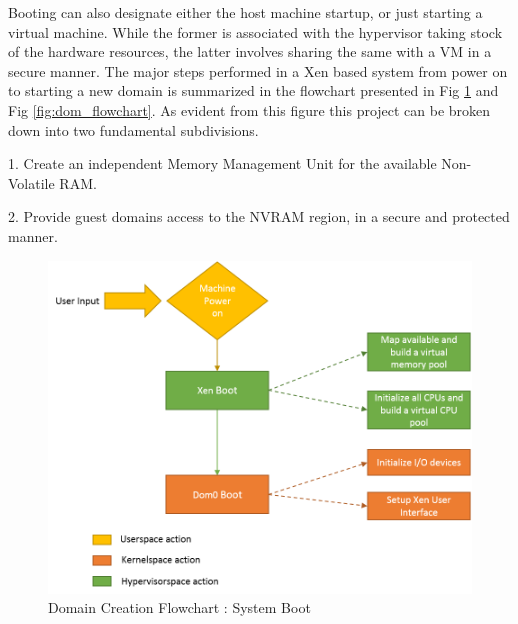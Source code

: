 Booting can also designate either the host machine startup, or just starting a virtual machine. While the former is associated with the hypervisor taking stock of the hardware resources, the latter involves sharing the same with a VM in a secure manner. The major steps performed in a Xen based system from power on to starting a new domain is summarized in the flowchart presented in Fig \ref{fig:xen_flowchart} and Fig \ref{fig:dom_flowchart}. As evident from this figure this project can be broken down into two fundamental subdivisions.

1. Create an independent Memory Management Unit for the available Non-Volatile RAM.

2. Provide guest domains access to the NVRAM region, in a secure and protected manner. 


\begin{figure}[H]
\centering
\includegraphics[scale=0.9]{figures/domain_creation1.png}
\caption{Domain Creation Flowchart : System Boot}
\label{fig:xen_flowchart}
\end{figure}

